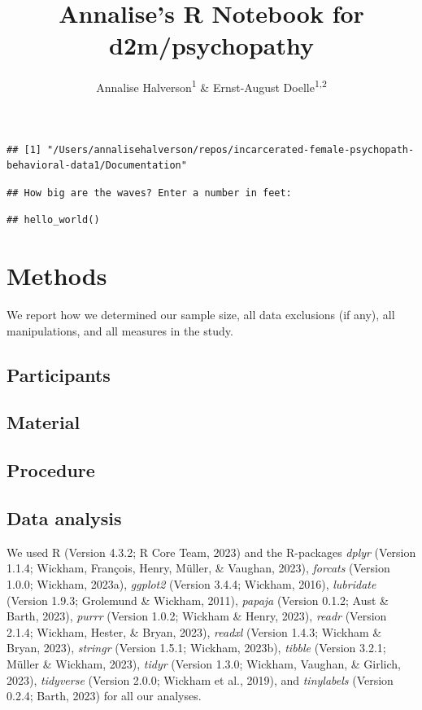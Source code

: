 \documentclass[
  man]{apa6}
\title{Annalise's R Notebook for d2m/psychopathy}
\author{Annalise Halverson\textsuperscript{1} \& Ernst-August Doelle\textsuperscript{1,2}}
\date{}
\affiliation{\vspace{0.5cm}\textsuperscript{1} Wilhelm-Wundt-University\\\textsuperscript{2} Konstanz Business School}
\begin{document}
\maketitle

\begin{verbatim}
## [1] "/Users/annalisehalverson/repos/incarcerated-female-psychopath-behavioral-data1/Documentation"
\end{verbatim}

\begin{verbatim}
## How big are the waves? Enter a number in feet:
\end{verbatim}

\begin{verbatim}
## hello_world()
\end{verbatim}

\hypertarget{methods}{%
\section{Methods}\label{methods}}

We report how we determined our sample size, all data exclusions (if any), all manipulations, and all measures in the study.

\hypertarget{participants}{%
\subsection{Participants}\label{participants}}

\hypertarget{material}{%
\subsection{Material}\label{material}}

\hypertarget{procedure}{%
\subsection{Procedure}\label{procedure}}

\hypertarget{data-analysis}{%
\subsection{Data analysis}\label{data-analysis}}

We used R (Version 4.3.2; R Core Team, 2023) and the R-packages \emph{dplyr} (Version 1.1.4; Wickham, François, Henry, Müller, \& Vaughan, 2023), \emph{forcats} (Version 1.0.0; Wickham, 2023a), \emph{ggplot2} (Version 3.4.4; Wickham, 2016), \emph{lubridate} (Version 1.9.3; Grolemund \& Wickham, 2011), \emph{papaja} (Version 0.1.2; Aust \& Barth, 2023), \emph{purrr} (Version 1.0.2; Wickham \& Henry, 2023), \emph{readr} (Version 2.1.4; Wickham, Hester, \& Bryan, 2023), \emph{readxl} (Version 1.4.3; Wickham \& Bryan, 2023), \emph{stringr} (Version 1.5.1; Wickham, 2023b), \emph{tibble} (Version 3.2.1; Müller \& Wickham, 2023), \emph{tidyr} (Version 1.3.0; Wickham, Vaughan, \& Girlich, 2023), \emph{tidyverse} (Version 2.0.0; Wickham et al., 2019), and \emph{tinylabels} (Version 0.2.4; Barth, 2023) for all our analyses.
\end{document}
